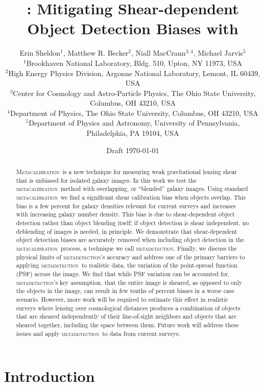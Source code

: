 \documentclass[fleqn,useAMS,usenatbib]{mnras}
\title[\Mdet]{\Mdet: Mitigating Shear-dependent Object Detection Biases with \Mcal}
\author[Sheldon et~al.]{Erin Sheldon$^1$, Matthew R. Becker$^2$,
Niall MacCrann$^{3,4}$, Michael Jarvis$^5$
  \\$^1$Brookhaven National Laboratory, Bldg. 510, Upton, NY 11973, USA
  \\$^2$High Energy Physics Division, Argonne National Laboratory, Lemont, IL 60439, USA
  \\$^3$Center for Cosmology and Astro-Particle Physics, The Ohio State University, Columbus, OH 43210, USA
  \\$^4$Department of Physics, The Ohio State University, Columbus, OH 43210, USA
  \\$^5$Department of Physics and Astronomy, University of Pennsylvania, Philadelphia, PA 19104, USA
}
\newcommand{\mcal}{\textsc{metacalibration}}
\newcommand{\mdet}{\textsc{metadetection}}
\newcommand{\Mcal}{\textsc{Metacalibration}}
\begin{document}
\date{Draft \today}
\maketitle

\begin{abstract}

    \Mcal\ is a new technique for measuring weak gravitational lensing shear
    that is unbiased for isolated galaxy images.  In this work we test the
    \mcal\ method with overlapping, or ``blended'' galaxy images.  Using
    standard \mcal\ we find a significant shear calibration bias when objects
    overlap.  This bias is a few percent for galaxy densities relevant for
    current surveys and increases with increasing galaxy number density.
    This bias is due to shear-dependent object detection rather than object
    blending itself; if object detection is shear independent, no deblending
    of images is needed, in principle.  We demonstrate that shear-dependent
    object detection biases are accurately removed when including object
    detection in the \mcal\ process, a technique we call \mdet. Finally, we
    discuss the physical limits of \mdet's accuracy and address one of the
    primary barriers to applying \mdet\ to realistic data, the variation of the
    point-spread function (PSF) across the image. We find that while PSF variation
    can be accounted for, \mdet's key assumption, that the entire image is
    sheared, as opposed to only the objects in the image, can result in few
    tenths of percent biases in a worse case scenario. However, more work will
    be required to estimate this effect in realistic surveys where lensing over
    cosmological distances produces a combination of objects that are sheared
    independently of their line-of-sight neighbors and objects that are sheared
    together, including the space between them. Future work will address these
    issues and apply \mdet\ to data from current surveys.

\end{abstract}

\section{Introduction}
\end{document}
